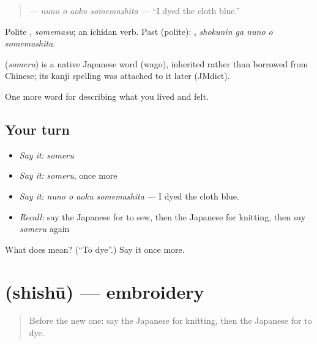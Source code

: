 \begin{quote}
\textbf{  } — \emph{nuno o aoku somemashita} — \textquotedblleft{}I dyed the cloth blue.\textquotedblright{}
\end{quote}

Polite \textbf{}, \emph{somemasu}; an ichidan verb. Past (polite): \textbf{  }, \emph{shokunin ga nuno o somemashita}.

\begin{cousinweb}
\textbf{} (\emph{someru}) is a native Japanese word (wago), inherited rather than borrowed from Chinese; its kanji spelling was attached to it later (JMdict).
\end{cousinweb}

\begin{grammarlens}[title={What you've built}]
One more word for describing what you lived and felt.
\end{grammarlens}

\subsection*{Your turn}
\begin{itemize}
\raggedright
  \item \emph{Say it:} \emph{someru}
  \item \emph{Say it:} \emph{someru}, once more
  \item \emph{Say it:} \emph{nuno o aoku somemashita} — I dyed the cloth blue.
  \item \emph{Recall:} say the Japanese for to sew, then the Japanese for knitting, then say \emph{someru} again
\end{itemize}

\begin{tcolorbox}[breakable,colback=teal!4,colframe=teal!35!black,title={Before you move on}]
What does  mean? (\textquotedblleft{}To dye\textquotedblright{}.) Say it once more.
\end{tcolorbox}
\section[\texorpdfstring{\ja{ししゅう} (shishū)}{ししゅう (shishū)}]{ (shishū) — embroidery}

\label{lesson:JA-C467-shishuu}



\begin{quote}
Before the new one: say the Japanese for knitting, then the Japanese for to dye.
\end{quote}

